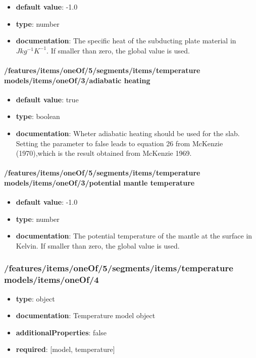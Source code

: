 \begin{itemize}\item {\bf default value}: -1.0
\item {\bf type}: number
\item {\bf documentation}: The specific heat of the subducting plate material in $J kg^{-1} K^{-1}$. If smaller than zero, the global value is used.
\end{itemize}\paragraph{/features/items/oneOf/5/segments/items/temperature models/items/oneOf/3/adiabatic heating}
\begin{itemize}\item {\bf default value}: true
\item {\bf type}: boolean
\item {\bf documentation}: Wheter adiabatic heating should be used for the slab. Setting the parameter to false leads to equation 26 from McKenzie (1970),which is the result obtained from McKenzie 1969.
\end{itemize}\paragraph{/features/items/oneOf/5/segments/items/temperature models/items/oneOf/3/potential mantle temperature}
\begin{itemize}\item {\bf default value}: -1.0
\item {\bf type}: number
\item {\bf documentation}: The potential temperature of the mantle at the surface in Kelvin. If smaller than zero, the global value is used.
\end{itemize}\subsubsection{/features/items/oneOf/5/segments/items/temperature models/items/oneOf/4}
\begin{itemize}\item {\bf type}: object
\item {\bf documentation}: Temperature model object
\item {\bf additionalProperties}: false
\item {\bf required}: [model, temperature]\end{itemize}
